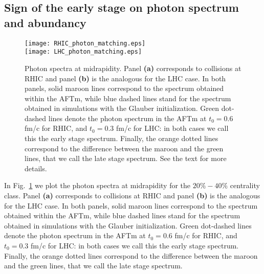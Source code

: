 \documentclass[aps,prc,a4paper,nofootinbib,
preprintnumbers,superscriptaddress,twocolumn,showpacs,showkeys]{revtex4}
\begin{document}
\subsection{Sign of the early stage on photon spectrum and abundancy}

\begin{figure}[t!]
\begin{center}
\texttt{[image: RHIC\_photon\_matching.eps]}\\
\texttt{[image: LHC\_photon\_matching.eps]}
\caption{\label{Fig:e}Photon spectra at midrapidity. Panel {\bf (a)} corresponds to collisions at RHIC
and panel {\bf (b)} is the analogous for the LHC case.
In both panels, solid maroon lines correspond to the spectrum obtained within the AFTm, while blue dashed
lines stand for the spectrum obtained in simulations with the Glauber initialization.
Green dot-dashed lines denote the photon spectrum in the AFTm at $t_0=0.6$ fm/c for RHIC,
and $t_0=0.3$ fm/c for LHC: in both cases we call this the early stage spectrum. Finally, 
the orange dotted lines correspond to the difference between the maroon and the green lines,
that we call the late stage spectrum. See the text for more details.}
\end{center}
\end{figure}

In Fig.~\ref{Fig:e} we plot the photon spectra at midrapidity
for the $20\%-40\%$ centrality class. Panel {\bf (a)} corresponds to collisions at RHIC
and panel {\bf (b)} is the analogous for the LHC case.
In both panels, solid maroon lines correspond to the spectrum obtained within the AFTm, while blue dashed
lines stand for the spectrum obtained in simulations with the Glauber initialization.
Green dot-dashed lines denote the photon spectrum in the AFTm at $t_0=0.6$ fm/c for RHIC,
and $t_0=0.3$ fm/c for LHC: in both cases we call this the early stage spectrum. Finally, 
the orange dotted lines correspond to the difference between the maroon and the green lines,
that we call the late stage spectrum. 
\end{document}
